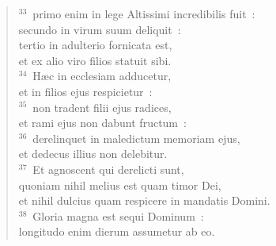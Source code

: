 \begin{verse}
${}^{33}$~primo enim in lege Altissimi incredibilis fuit~:\\ secundo in virum suum deliquit~:\\ tertio in adulterio fornicata est,\\ et ex alio viro filios statuit sibi.\\
${}^{34}$~H\ae c in ecclesiam adducetur,\\ et in filios ejus respicietur~:\\
${}^{35}$~non tradent filii ejus radices,\\ et rami ejus non dabunt fructum~:\\
${}^{36}$~derelinquet in maledictum memoriam ejus,\\ et dedecus illius non delebitur.\\
${}^{37}$~Et agnoscent qui derelicti sunt,\\ quoniam nihil melius est quam timor Dei,\\ et nihil dulcius quam respicere in mandatis Domini.\\
${}^{38}$~Gloria magna est sequi Dominum~:\\ longitudo enim dierum assumetur ab eo.\end{verse}


